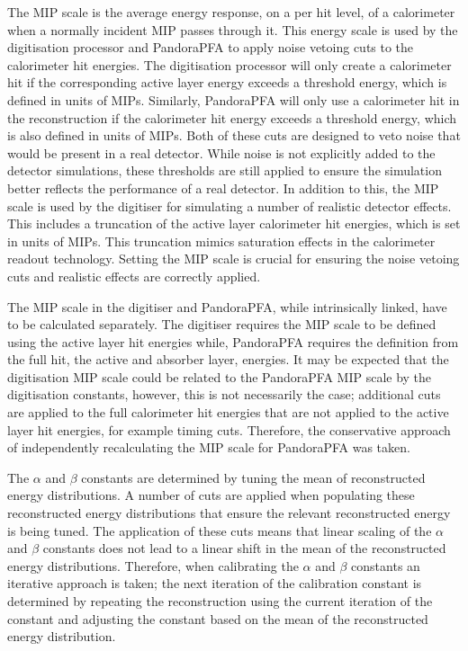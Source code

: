 The MIP scale is the average energy response, on a per hit level, of a calorimeter when a normally incident MIP passes through it.  This energy scale is used by the digitisation processor and PandoraPFA to apply noise vetoing cuts to the calorimeter hit energies.  The digitisation processor will only create a calorimeter hit if the corresponding active layer energy exceeds a threshold energy, which is defined in units of MIPs.  Similarly, PandoraPFA will only use a calorimeter hit in the reconstruction if the calorimeter hit energy exceeds a threshold energy, which is also defined in units of MIPs.  Both of these cuts are designed to veto noise that would be present in a real detector.  While noise is not explicitly added to the detector simulations, these thresholds are still applied to ensure the simulation better reflects the performance of a real detector.  In addition to this, the MIP scale is used by the digitiser for simulating a number of realistic detector effects.  This includes a truncation of the active layer calorimeter hit energies, which is set in units of MIPs.  This truncation mimics saturation effects in the calorimeter readout technology.  Setting the MIP scale is crucial for ensuring the noise vetoing cuts and realistic effects are correctly applied.
 
The MIP scale in the digitiser and PandoraPFA, while intrinsically linked, have to be calculated separately.  The digitiser requires the MIP scale to be defined using the active layer hit energies while, PandoraPFA requires the definition from the full hit, the active and absorber layer, energies.  It may be expected that the digitisation MIP scale could be related to the PandoraPFA MIP scale by the digitisation constants, however, this is not necessarily the case; additional cuts are applied to the full calorimeter hit energies that are not applied to the active layer hit energies, for example timing cuts.  Therefore, the conservative approach of independently recalculating the MIP scale for PandoraPFA was taken.   

The $\alpha$ and $\beta$ constants are determined by tuning the mean of reconstructed energy distributions.  A number of cuts are applied when populating these reconstructed energy distributions that ensure the relevant reconstructed energy is being tuned.  The application of these cuts means that linear scaling of the $\alpha$ and $\beta$ constants does not lead to a linear shift in the mean of the reconstructed energy distributions.  Therefore, when calibrating the $\alpha$ and $\beta$ constants an iterative approach is taken; the next iteration of the calibration constant is determined by repeating the reconstruction using the current iteration of the constant and adjusting the constant based on the mean of the reconstructed energy distribution.  

